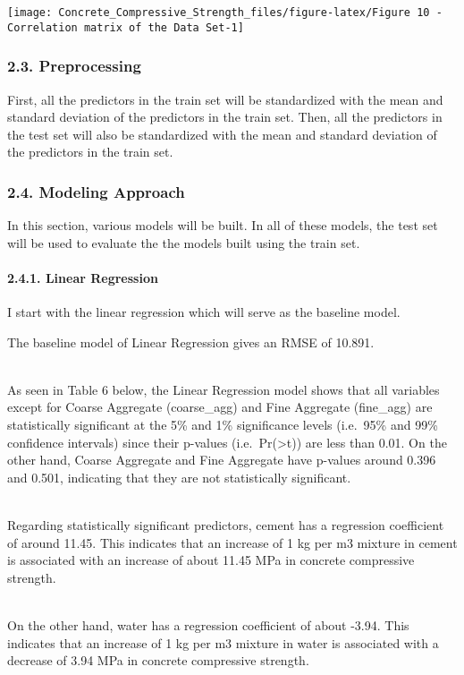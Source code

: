 \documentclass[
]{article}
\begin{document}
\begin{center}\texttt{[image: Concrete\_Compressive\_Strength\_files/figure-latex/Figure 10 - Correlation matrix of the Data Set-1]} \end{center}

\hypertarget{preprocessing}{%
\subsubsection{2.3. Preprocessing}\label{preprocessing}}

First, all the predictors in the train set will be standardized with the
mean and standard deviation of the predictors in the train set. Then,
all the predictors in the test set will also be standardized with the
mean and standard deviation of the predictors in the train set.

\hypertarget{modeling-approach}{%
\subsubsection{2.4. Modeling Approach}\label{modeling-approach}}

In this section, various models will be built. In all of these models,
the test set will be used to evaluate the the models built using the
train set.

\hypertarget{linear-regression}{%
\paragraph{2.4.1. Linear Regression}\label{linear-regression}}

\hfill\break
I start with the linear regression which will serve as the baseline
model.

\hfill\break
The baseline model of Linear Regression gives an RMSE of 10.891.\\
\strut \\
As seen in Table 6 below, the Linear Regression model shows that all
variables except for Coarse Aggregate (coarse\_agg) and Fine Aggregate
(fine\_agg) are statistically significant at the 5\% and 1\%
significance levels (i.e.~95\% and 99\% confidence intervals) since
their p-values (i.e.~Pr(\textgreater\textbar t\textbar)) are less than
0.01. On the other hand, Coarse Aggregate and Fine Aggregate have
p-values around 0.396 and 0.501, indicating that they are not
statistically significant.\\
\strut \\
Regarding statistically significant predictors, cement has a regression
coefficient of around 11.45. This indicates that an increase of 1 kg per
m3 mixture in cement is associated with an increase of about 11.45 MPa
in concrete compressive strength.\\
\strut \\
On the other hand, water has a regression coefficient of about -3.94.
This indicates that an increase of 1 kg per m3 mixture in water is
associated with a decrease of 3.94 MPa in concrete compressive
strength.\\
\end{document}
